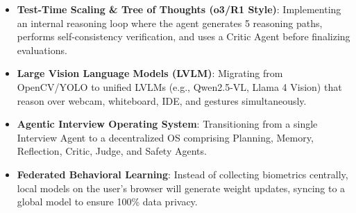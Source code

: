 \documentclass[10pt,journal,compsoc]{IEEEtran}
\begin{document}
\begin{itemize}
    \item \textbf{Test-Time Scaling \& Tree of Thoughts (o3/R1 Style)}: Implementing an internal reasoning loop where the agent generates 5 reasoning paths, performs self-consistency verification, and uses a Critic Agent before finalizing evaluations.
    \item \textbf{Large Vision Language Models (LVLM)}: Migrating from OpenCV/YOLO to unified LVLMs (e.g., Qwen2.5-VL, Llama 4 Vision) that reason over webcam, whiteboard, IDE, and gestures simultaneously.
    \item \textbf{Agentic Interview Operating System}: Transitioning from a single Interview Agent to a decentralized OS comprising Planning, Memory, Reflection, Critic, Judge, and Safety Agents.
    \item \textbf{Federated Behavioral Learning}: Instead of collecting biometrics centrally, local models on the user's browser will generate weight updates, syncing to a global model to ensure 100\% data privacy.
\end{itemize}
\end{document}
